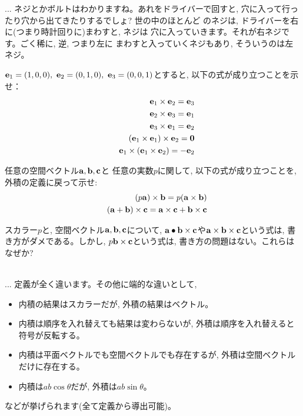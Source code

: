 \begin{faq}{\small{}
... ネジとかボルトはわかりますね。あれをドライバーで回すと, 
穴に入って行ったり穴から出てきたりするでしょ? 世の中のほとんど
のネジは, ドライバーを右に(つまり時計回りに)まわすと, ネジは
穴に入っていきます。それが右ネジです。ごく稀に, 逆, つまり左に
まわすと入っていくネジもあり, そういうのは左ネジ。}\end{faq}\hv

\begin{q}\label{q:univ_vectprod2} ${\bf e}_1=(1, 0, 0),\,\, {\bf e}_2=(0, 1, 0),\,\, {\bf e}_3=(0, 0, 1)$とすると, 
以下の式が成り立つことを示せ：
\begin{eqnarray}
&&{\bf e}_1\times{\bf e}_2={\bf e}_3\\
&&{\bf e}_2\times{\bf e}_3={\bf e}_1\\
&&{\bf e}_3\times{\bf e}_1={\bf e}_2\\
&&({\bf e}_1\times{\bf e}_1)\times{\bf e}_2={\bf 0}\\
&&{\bf e}_1\times({\bf e}_1\times{\bf e}_2)=-{\bf e}_2
\end{eqnarray}
\end{q}
\vspace{0.3cm}

\begin{q}\label{q:univ_vectprod3} 任意の空間ベクトル${\bf a}, {\bf b}, {\bf c}$と
任意の実数$p$に関して, 以下の式が成り立つことを, 外積の定義に戻って示せ:
\begin{eqnarray}
&&(p{\bf a})\times{\bf b}=p({\bf a}\times{\bf b})\label{eq:vectprod_scalar}\\
&&({\bf a}+{\bf b})\times{\bf c}={\bf a}\times{\bf c}+{\bf b}\times{\bf c}\label{eq:vectprod_bumpai}
\end{eqnarray}
\end{q}\hv

\begin{q}\label{q:scalar3prod_style} スカラー$p$と, 空間ベクトル${\bf a}, {\bf b}, {\bf c}$について, 
${\bf a}\bullet{\bf b}\times{\bf c}$や${\bf a}\times{\bf b}\times{\bf c}$という式は, 書き方がダメである。しかし, $p{\bf b}\times{\bf c}$という式は, 書き方の問題はない。これらはなぜか?
\end{q}\hv


\begin{faq}{\small{}\\
... 定義が全く違います。その他に端的な違いとして, 
\begin{itemize}
\item 内積の結果はスカラーだが, 外積の結果はベクトル。
\item 内積は順序を入れ替えても結果は変わらないが, 外積は順序を入れ替えると符号が反転する。
\item 内積は平面ベクトルでも空間ベクトルでも存在するが, 外積は空間ベクトルだけに存在する。
\item 内積は$ab\cos\theta$だが, 外積は$ab \sin\theta$。
\end{itemize}
などが挙げられます(全て定義から導出可能)。}\end{faq}
\hv


